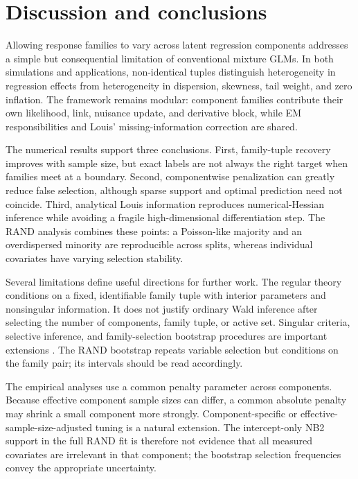\documentclass[11pt]{article}
\begin{document}
\section{Discussion and conclusions}
\label{sec:discussion}

Allowing response families to vary across latent regression components
addresses a simple but consequential limitation of conventional mixture GLMs.
In both simulations and applications, non-identical tuples distinguish
heterogeneity in regression effects from heterogeneity in dispersion, skewness,
tail weight, and zero inflation.  The framework remains modular: component
families contribute their own likelihood, link, nuisance update, and derivative
block, while EM responsibilities and Louis' missing-information correction are
shared.

The numerical results support three conclusions.  First, family-tuple recovery
improves with sample size, but exact labels are not always the right target when
families meet at a boundary.  Second, componentwise penalization can greatly
reduce false selection, although sparse support and optimal prediction need not
coincide.  Third, analytical Louis information reproduces numerical-Hessian
inference while avoiding a fragile high-dimensional differentiation step.  The
RAND analysis combines these points: a Poisson-like majority and an
overdispersed minority are reproducible across splits, whereas individual
covariates have varying selection stability.

Several limitations define useful directions for further work.  The regular
theory conditions on a fixed, identifiable family tuple with interior
parameters and nonsingular information.  It does not justify ordinary Wald
inference after selecting the number of components, family tuple, or active
set.  Singular criteria, selective inference, and family-selection bootstrap
procedures are important extensions \citep{drton2017sbic,leeb2005selection}.
The RAND bootstrap repeats variable selection but conditions on the family pair;
its intervals should be read accordingly.

The empirical analyses use a common penalty parameter across components.
Because effective component sample sizes can differ, a common absolute penalty
may shrink a small component more strongly.  Component-specific or
effective-sample-size-adjusted tuning is a natural extension.  The
intercept-only NB2 support in the full RAND fit is therefore not evidence that
all measured covariates are irrelevant in that component; the bootstrap
selection frequencies convey the appropriate uncertainty.
\end{document}
